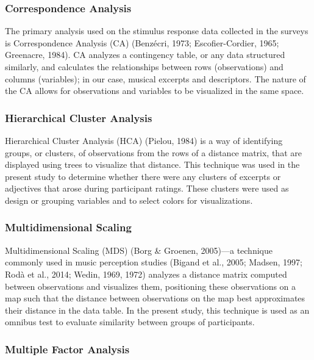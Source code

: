 \documentclass[
  english,
  man,floatsintext]{apa6}
\begin{document}
\hypertarget{correspondence-analysis}{%
\subsubsection{Correspondence Analysis}\label{correspondence-analysis}}

The primary analysis used on the stimulus response data collected in the surveys is Correspondence Analysis (CA) (Benzécri, 1973; Escofier-Cordier, 1965; Greenacre, 1984). CA analyzes a contingency table, or any data structured similarly, and calculates the relationships between rows (observations) and columns (variables); in our case, musical excerpts and descriptors. The nature of the CA allows for observations and variables to be visualized in the same space.

\hypertarget{hierarchical-cluster-analysis}{%
\subsubsection{Hierarchical Cluster Analysis}\label{hierarchical-cluster-analysis}}

Hierarchical Cluster Analysis (HCA) (Pielou, 1984) is a way of identifying groups, or clusters, of observations from the rows of a distance matrix, that are displayed using trees to visualize that distance. This technique was used in the present study to determine whether there were any clusters of excerpts or adjectives that arose during participant ratings. These clusters were used as design or grouping variables and to select colors for visualizations.

\hypertarget{multidimensional-scaling}{%
\subsubsection{Multidimensional Scaling}\label{multidimensional-scaling}}

Multidimensional Scaling (MDS) (Borg \& Groenen, 2005)---a technique commonly used in music perception studies (Bigand et al., 2005; Madsen, 1997; Rodà et al., 2014; Wedin, 1969, 1972) analyzes a distance matrix computed between observations and visualizes them, positioning these observations on a map such that the distance between observations on the map best approximates their distance in the data table. In the present study, this technique is used as an omnibus test to evaluate similarity between groups of participants.

\hypertarget{multiple-factor-analysis}{%
\subsubsection{Multiple Factor Analysis}\label{multiple-factor-analysis}}
\end{document}
